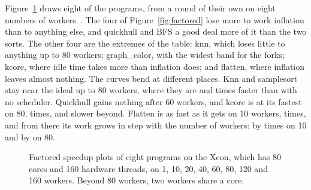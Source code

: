 \documentclass[sigplan,nonacm]{acmart}
\begin{document}
Figure~\ref{fig:factoredicelake} draws eight of the programs, from a
round of their own on eight numbers of
workers~\cite{flexibench-denseicelake}.
%
The four of Figure~\ref{fig:factored} lose more to work inflation
than to anything else, and quickhull and BFS a good deal more of it
than the two sorts.
%
The other four are the extremes of the table: knn, which loses little
to anything up to 80 workers; graph\_color, with the widest band for
the forks; kcore, where idle time takes more than inflation
does; and flatten, where inflation leaves almost nothing.
%
The curves bend at different places.
%
Knn and samplesort stay near the ideal up to 80 workers, where they are
 and
 times faster than
with no scheduler.
%
Quickhull gains nothing after 60 workers, and kcore is at its fastest
on 80,  times, and slower
beyond.
%
Flatten is as fast as it gets on 10 workers,
 times, and from there
its work grows in step with the number of workers: by
 times on 10 and by
 on 80.

\begin{figure}
\centering
{}\hfill
{}\hfill
{}\hfill
{}

\smallskip
{}\hfill
{}\hfill
{}\hfill
{}

\smallskip
\factoredlegend
\caption{Factored speedup plots of eight programs on the Xeon, which
  has 80 cores and 160 hardware threads, on 1, 10, 20, 40, 60, 80, 120
  and 160 workers.
  Beyond 80 workers, two workers share a core.}
\label{fig:factoredicelake}
\end{figure}
\end{document}
